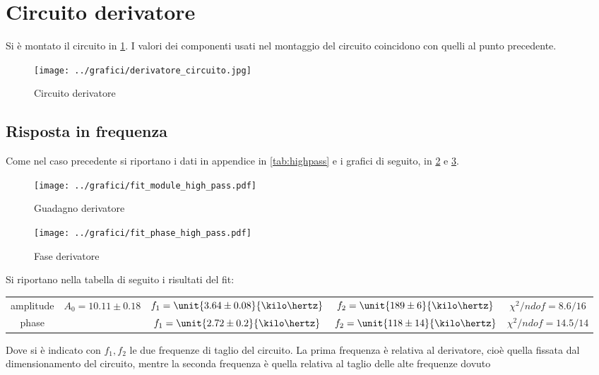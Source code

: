 \documentclass[10pt,a4paper]{article}
\begin{document}
\section{Circuito derivatore}

Si è montato il circuito in \figurename{\ref{derivatore}}. I valori dei componenti usati nel montaggio del circuito coincidono con quelli al punto precedente.

\begin{figure}[H]
	\centering
	\texttt{[image: ../grafici/derivatore\_circuito.jpg]}
	\caption{Circuito derivatore}
	\label{derivatore}
\end{figure}

\subsection{Risposta in frequenza}

Come nel caso precedente si riportano i dati in appendice in \tablename{\ref{tab:highpass}} e i grafici di seguito, in \figurename{\ref{fig:highamp}} e \figurename{\ref{fig:highph}}.

	\begin{figure}[H]
		\centering
		\texttt{[image: ../grafici/fit\_module\_high\_pass.pdf]}
		\caption{Guadagno derivatore}
		\label{fig:highamp}
	\end{figure}
	\begin{figure}[H]
		\centering
		\texttt{[image: ../grafici/fit\_phase\_high\_pass.pdf]}
		\caption{Fase derivatore}
		\label{fig:highph}
	\end{figure}

Si riportano nella tabella di seguito i risultati del fit:

\begin{table}[H]
\centering
\begin{tabular}{c|cccc}
amplitude	&	$A_0 = 10.11 \pm 0.18$	&	$f_1 = \unit{3.64 \pm 0.08}{\kilo\hertz}$	&	$f_2 = \unit{189 \pm 6}{\kilo\hertz}$	&	$\chi^2/ndof = 8.6 / 16$\\
phase		& &	$f_1 = \unit{2.72 \pm 0.2}{\kilo\hertz}$	&	$f_2 = \unit{118 \pm 14}{\kilo\hertz}$	&	$\chi^2/ndof = 14.5 / 14$
\end{tabular}
\end{table}

\noindent Dove si è indicato con $f_1, f_2$ le due frequenze di taglio del circuito. La prima frequenza è relativa al derivatore, cioè quella fissata dal dimensionamento del circuito, mentre la seconda frequenza è quella relativa al taglio delle alte frequenze dovuto 
\end{document}
